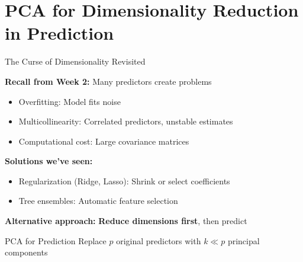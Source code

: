 \documentclass[10pt]{beamer}
\newcommand{\highlight}[1]{\textcolor{AccentOrange}{\textbf{#1}}}
\begin{document}
\section{PCA for Dimensionality Reduction in Prediction}

\begin{frame}{The Curse of Dimensionality Revisited}

  \textbf{Recall from Week 2:} Many predictors create problems

  \vspace{0.5em}
  \begin{itemize}
    \item Overfitting: Model fits noise
    \item Multicollinearity: Correlated predictors, unstable estimates
    \item Computational cost: Large covariance matrices
  \end{itemize}

  \vspace{1em}
  \textbf{Solutions we've seen:}
  \begin{itemize}
    \item Regularization (Ridge, Lasso): Shrink or select coefficients
    \item Tree ensembles: Automatic feature selection
  \end{itemize}

  \vspace{0.5em}
  \textbf{Alternative approach:} \highlight{Reduce dimensions first}, then predict

  \vspace{0.3em}
  \begin{block}{PCA for Prediction}
    Replace $p$ original predictors with $k \ll p$ principal components
  \end{block}
\end{frame}

\end{document}
